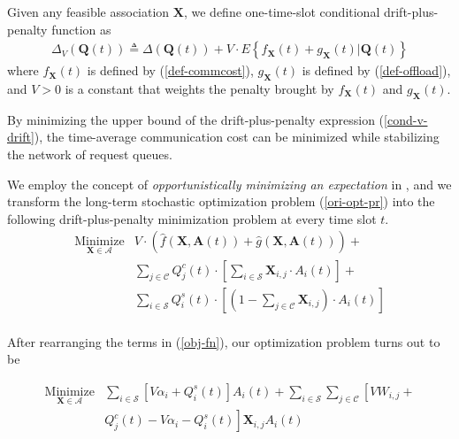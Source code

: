 \documentclass[10pt,journal,compsoc]{IEEEtran}
\begin{document}
Given any feasible association $\mathbf{X}$, we define one-time-slot conditional drift-plus-penalty function as
\begin{equation}\label{cond-v-drift}
	\begin{array}{c}
		\Delta_V(\mathbf{Q}(t)) \triangleq \Delta(\mathbf{Q}(t)) + V \cdot E\left\{f_{\mathbf{X}}(t) + g_{\mathbf{X}}(t)|\mathbf{Q}(t)\right\}
	\end{array}
\end{equation}
where $f_{\mathbf{X}}(t)$ is defined by (\ref{def-commcost}), $g_{\mathbf{X}}(t)$ is defined by (\ref{def-offload}), and $V > 0$ is a constant that weights the penalty brought by $f_{\mathbf{X}}(t)$ and $g_{\mathbf{X}}(t)$.

By minimizing the upper bound of the drift-plus-penalty expression (\ref{cond-v-drift}), the time-average communication cost can be minimized while stabilizing the network of request queues. 

We employ the concept of \emph{opportunistically minimizing an expectation} in \cite{neely2010stochastic}, and we transform the long-term stochastic optimization problem (\ref{ori-opt-pr}) into the following drift-plus-penalty minimization problem at every time slot $t$.
\begin{equation}\label{obj-fn}
	\begin{array}{cl}
	\underset{\mathbf{X} \in \mathcal{A}}{\text{Minimize}} & \displaystyle
	V \cdot \left( \hat{f}(\mathbf{X}, \mathbf{A}(t)) + \hat{g}(\mathbf{X}, \mathbf{A}(t)) \right) + \\
	& \displaystyle \sum_{j \in \mathcal{C}} Q^c_j(t) \cdot \left[ \sum_{i \in \mathcal{S}} \mathbf{X}_{i,j} \cdot A_i(t) \right] + \\
	& \displaystyle \sum_{i \in \mathcal{S}} Q^s_i(t) \cdot \left[ (1 - \sum_{j \in \mathcal{C}} \mathbf{X}_{i,j}) \cdot A_i(t) \right] \\
	\end{array}
\end{equation}

After rearranging the terms in (\ref{obj-fn}), our optimization problem turns out to be

\begin{equation}\label{opt-pr}
	\begin{array}{ll}
		\underset{\mathbf{X} \in \mathcal{A}}{\text{Minimize}} & \displaystyle \sum_{i \in \mathcal{S}} \displaystyle \left[ V \alpha_i + Q^s_i(t) \right] A_i(t) + \sum_{i \in \mathcal{S}} \sum_{j \in \mathcal{C}} 
			\left[ V W_{i,j} + \right. \\
		& \displaystyle 
		\left. Q_j^c(t) - V\alpha_i - Q^s_i(t) \right] \mathbf{X}_{i,j} A_i(t) \\
	\end{array}
\end{equation}
\end{document}
